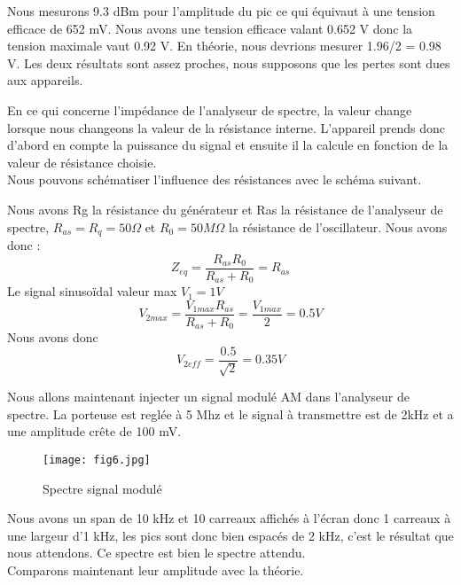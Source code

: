 \documentclass[oneside,a4paper,12pt]{article}
\begin{document}
	Nous mesurons 9.3 dBm pour l’amplitude du pic ce qui équivaut à une tension efficace de 652 mV. Nous avons une tension efficace valant 0.652 V donc la tension maximale vaut 0.92 V. En théorie, nous devrions mesurer 1.96/2 = 0.98 V. Les deux résultats sont assez proches, nous supposons que les pertes sont dues aux appareils.
	
	En ce qui concerne l’impédance de l’analyseur de spectre, la valeur change lorsque nous changeons la valeur de la résistance interne. L’appareil prends donc d’abord en compte la puissance du signal et ensuite il la calcule en fonction de la valeur de résistance choisie.\\ 
	
	Nous pouvons schématiser l’influence des résistances avec le schéma suivant.
	
	Nous avons Rg la résistance du générateur et Ras la résistance de l’analyseur de spectre, $R_{as} = R_{q} = 50\Omega$ et $ R_{0} = 50 M\Omega $ la résistance de l'oscillateur.
	Nous avons donc :
	$$ Z_{eq} = \frac{R_{as}R_{0}}{R_{as} + R_{0}} = R_{as} $$ 
	Le signal sinusoïdal valeur max $V_{1} = 1 V$\\
	$$ V_{2 max} = \frac{V_{1 max} R_{as}}{R_{as} + R_{0}} = \frac{V_{1 max}}{2} = 0.5V $$
	Nous avons donc $$ V_{2 eff} = \frac{0.5}{\sqrt{2}} = 0.35V $$
	
	Nous allons maintenant injecter un signal modulé AM dans l’analyseur de spectre. La porteuse est reglée à 5 Mhz et le signal à transmettre est de 2kHz et a une amplitude crête de 100 mV.
	
	\begin{figure}[h]
		\centering
		\texttt{[image: fig6.jpg]}
		\caption{Spectre signal modulé}
	\end{figure}
	
	Nous avons un span de 10 kHz et 10 carreaux affichés à l’écran donc 1 carreaux à une largeur d’1 kHz, les pics sont donc bien espacés de 2 kHz, c’est le résultat que nous attendons. 
	Ce spectre est bien le spectre attendu.\\
	
	Comparons maintenant leur amplitude avec la théorie.
	
	
\end{document}
